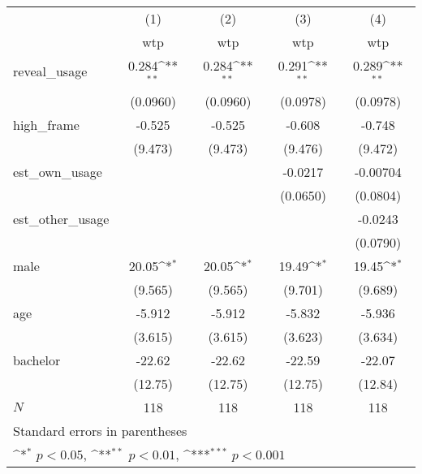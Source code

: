 {
\def\sym#1{\ifmmode^{#1}\else\(^{#1}\)\fi}
\begin{tabular}{l*{4}{c}}
\hline\hline
          &\multicolumn{1}{c}{(1)}&\multicolumn{1}{c}{(2)}&\multicolumn{1}{c}{(3)}&\multicolumn{1}{c}{(4)}\\
          &\multicolumn{1}{c}{wtp}&\multicolumn{1}{c}{wtp}&\multicolumn{1}{c}{wtp}&\multicolumn{1}{c}{wtp}\\
\hline
reveal\_usage&    0.284\sym{**} &    0.284\sym{**} &    0.291\sym{**} &    0.289\sym{**} \\
          & (0.0960)         & (0.0960)         & (0.0978)         & (0.0978)         \\
[1em]
high\_frame&   -0.525         &   -0.525         &   -0.608         &   -0.748         \\
          &  (9.473)         &  (9.473)         &  (9.476)         &  (9.472)         \\
[1em]
est\_own\_usage&                  &                  &  -0.0217         & -0.00704         \\
          &                  &                  & (0.0650)         & (0.0804)         \\
[1em]
est\_other\_usage&                  &                  &                  &  -0.0243         \\
          &                  &                  &                  & (0.0790)         \\
[1em]
male      &    20.05\sym{*}  &    20.05\sym{*}  &    19.49\sym{*}  &    19.45\sym{*}  \\
          &  (9.565)         &  (9.565)         &  (9.701)         &  (9.689)         \\
[1em]
age       &   -5.912         &   -5.912         &   -5.832         &   -5.936         \\
          &  (3.615)         &  (3.615)         &  (3.623)         &  (3.634)         \\
[1em]
bachelor  &   -22.62         &   -22.62         &   -22.59         &   -22.07         \\
          &  (12.75)         &  (12.75)         &  (12.75)         &  (12.84)         \\
\hline
\(N\)     &      118         &      118         &      118         &      118         \\
\hline\hline
\multicolumn{5}{l}{\footnotesize Standard errors in parentheses}\\
\multicolumn{5}{l}{\footnotesize \sym{*} \(p<0.05\), \sym{**} \(p<0.01\), \sym{***} \(p<0.001\)}\\
\end{tabular}
}
